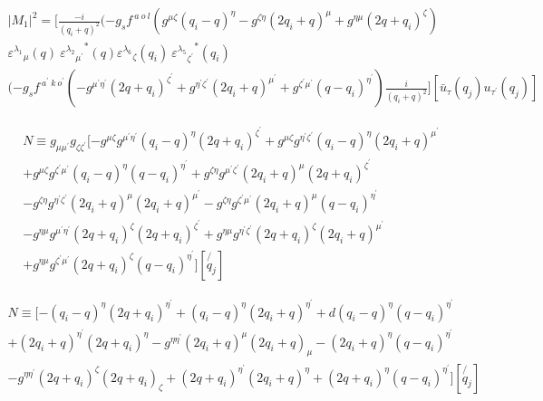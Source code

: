 \begin{equation}
\begin{split}
|M_1|^2=[\frac{-i}{(q_i +q)^2}(-g_s f^{\:a\:o\:l}(g^{{\mu}{\zeta}}(q_i-q)^{\eta}-g^{{\zeta}{\eta}}(2q_i +q)^{\mu}+g^{{\eta}{\mu}}(2q +q_i)^{\zeta})\\
{\varepsilon^{\lambda_1}}_{\mu} (q)\:{{\varepsilon^{\lambda_2}}_{{\mu}^{\prime}}}^* (q) {\varepsilon^{\lambda_6}}_{\zeta} (q_i)\:{{\varepsilon^{\lambda_5}}_{{\zeta}^{\prime}}}^* (q_i)\\
(-g_s f^{\:a^{\prime}\:k\:o^{\prime}}(-g^{{{\mu}^{\prime}}{{\eta}^{\prime}}}(2q+q_i)^{{\zeta}^{\prime}}+g^{{{\eta}^{\prime}}{{\zeta}^{\prime}}}(2q_i +q)^{{\mu}^{\prime}}+g^{{{\zeta}^{\prime}}{{\mu}^{\prime}}}(q-q_i)^{{\eta}^{\prime}})\frac{i}{(q_i +q)^2}][\bar{u}_{\tau}(q_j){u}_{{\tau}^{\prime}}(q_j)]
\end{split}
\end{equation}

\begin{equation}
\begin{split}
N\equiv g_{{\mu}{{\mu}^{\prime}}} g_{{\zeta}{{\zeta}^{\prime}}}[-g^{{\mu}{\zeta}}g^{{{\mu}^{\prime}}{{\eta}^{\prime}}}(q_i-q)^{{\eta}}(2q+q_i)^{{\zeta}^{\prime}}+g^{{\mu}{\zeta}}g^{{{\eta}^{\prime}}{{\zeta}^{\prime}}}(q_i-q)^{\eta}(2q_i +q)^{{\mu}^{\prime}}\\+g^{{\mu}{\zeta}}g^{{{\zeta}^{\prime}}{{\mu}^{\prime}}}(q_i-q)^{\eta}(q -q_i)^{{\eta}^{\prime}}+g^{{\zeta}{\eta}}g^{{{\mu}^{\prime}}{{\zeta}^{\prime}}}(2q_i +q)^{\mu}(2q+q_i)^{{\zeta}^{\prime}}\\
-g^{{\zeta}{\eta}}g^{{{\eta}^{\prime}}{{\zeta}^{\prime}}}(2q_i +q)^{\mu}(2q_i +q)^{{\mu}^{\prime}}-g^{{\zeta}{\eta}}g^{{{\zeta}^{\prime}}{{\mu}^{\prime}}}(2q_i +q)^{\mu}(q -q_i)^{{\eta}^{\prime}}\\
-g^{{\eta}{\mu}}g^{{{\mu}^{\prime}}{{\eta}^{\prime}}}(2q +q_i)^{\zeta}(2q+q_i)^{{\zeta}^{\prime}}+g^{{\eta}{\mu}}g^{{{\eta}^{\prime}}{{\zeta}^{\prime}}}(2q +q_i)^{\zeta}(2q_i +q)^{{\mu}^{\prime}}\\
+g^{{\eta}{\mu}}g^{{{\zeta}^{\prime}}{{\mu}^{\prime}}}(2q +q_i)^{\zeta}(q -q_i)^{{\eta}^{\prime}}][\not{q_j}]
\end{split}
\end{equation}


\begin{equation}
\begin{split}
N\equiv [-(q_i-q)^{{\eta}}(2q+q_i)^{{\eta}^{\prime}}+(q_i-q)^{\eta}(2q_i +q)^{{\eta}^{\prime}}+d(q_i-q)^{\eta}(q -q_i)^{{\eta}^{\prime}}\\+(2q_i +q)^{{\eta}^{\prime}}(2q+q_i)^{{\eta}}
-g^{{\eta}{{\eta}^{\prime}}}(2q_i +q)^{\mu}(2q_i +q)_{{\mu}}-(2q_i +q)^{\eta}(q -q_i)^{{\eta}^{\prime}}\\
-g^{{\eta}{{\eta}^{\prime}}}(2q +q_i)^{\zeta}(2q+q_i)_{{\zeta}}+(2q +q_i)^{{\eta}^{\prime}}(2q_i +q)^{{\eta}}
+(2q +q_i)^{\eta}(q -q_i)^{{\eta}^{\prime}}][\not{q_j}]
\end{split}
\end{equation}

